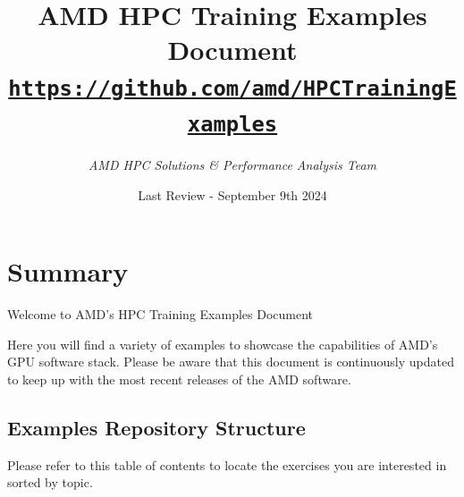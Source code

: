 \documentclass[
]{article}
\author{\it AMD HPC Solutions \& Performance Analysis Team }
\date{Last Review - September 9th 2024}
\title{\bf AMD HPC Training Examples Document \\
      \large \href{https://github.com/amd/HPCTrainingExamples}
                  {\texttt{https://github.com/amd/HPCTrainingExamples}}}
\begin{document}
\maketitle

{
\setcounter{tocdepth}{3}
\tableofcontents
}

\pagebreak
\hypertarget{amd-hpc-training-examples-repo}{%
\section{Summary}\label{amd-hpc-training-examples-repo}}

Welcome to AMD's HPC Training Examples Document

Here you will find a variety of examples to showcase the capabilities of
AMD's GPU software stack. Please be aware that this document is continuously
updated to keep up with the most recent releases of the AMD software.

\hypertarget{repository-structure}{%
\subsection{Examples Repository Structure}\label{repository-structure}}

Please refer to this table of contents to locate the exercises you are
interested in sorted by topic.
\end{document}
